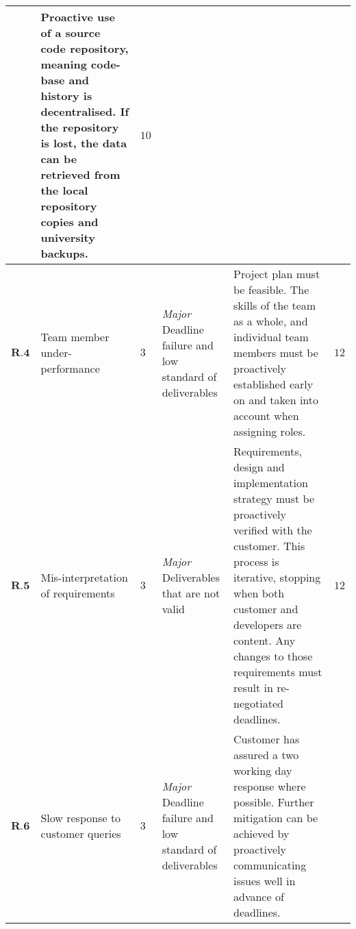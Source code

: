 \begin{longtable}[H]{| p{0.6cm} | p{2cm} | p{0.3cm} | p{2.6cm} | p{8.1cm} | p{0.7cm} |}
    & Proactive use of a source code repository, meaning code-base and history is decentralised. If the repository is lost, the data can be retrieved from the local repository copies and university backups.                                                                                                                                                                                                                                                                                                        
    & $10$    \\ \hline
    $\textbf{R.4}$     & Team member under-performance                    & $3$         & \textit{Major}
\newline Deadline failure and low standard  of deliverables            
    & Project plan must be feasible. The skills of the team as a whole, and individual team members must be proactively established early on and taken into account when assigning roles.                                                                                                                                                                                                                                                                                                                                                              
    & $12$    \\ \hline
    $\textbf{R.5}$    & Mis-interpretation of requirements                & $3$        & \textit{Major}
\newline Deliverables that are not valid                                        & 
    Requirements, design and implementation strategy must be proactively verified with the customer. This process is iterative, stopping when both customer and developers are content. Any changes to those requirements must result in re-negotiated deadlines.                                                                                                                                                                                                                                                                                    
    & $12$    \\ \hline
    $\textbf{R.6}$    & Slow response to customer queries                & $3$        & \textit{Major}
\newline Deadline failure and  low standard of deliverables         
    & Customer has assured a two working day response where possible. Further mitigation can be achieved by proactively communicating issues well in advance of deadlines.                                                                                                                                                                                                                                                                                                                                                                            

\end{longtable}
